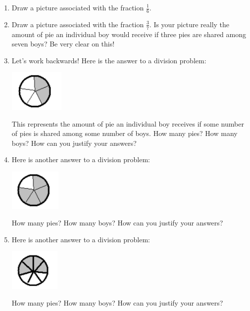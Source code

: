 \documentclass[10pt, reqno]{amsart}
\theoremstyle{remark}
\theoremstyle{definition}
\numberwithin{equation}{section}  %
\begin{document}
 \begin{enumerate}
 \item
 Draw a picture associated with the fraction $ \frac 1 6$.\\
 
 \item
Draw a picture associated with the fraction $ \frac 3 7$.
Is your picture
really the amount of pie an individual boy would receive if three pies are shared
among seven boys? Be very clear on this!\\

\item
Let's work backwards! Here is the answer to a division problem:
\begin{center}
\includegraphics[height = 2cm]{2fifthspie}
\end{center}
This represents the amount of pie an individual boy receives if some number of pies
is shared among some number of boys.  How many pies?  How many boys?  How can you justify your answers?\\

\item
Here is another answer to a division problem:
\begin{center}
\includegraphics[height = 2cm]{4fifthspie}
\end{center}
How many pies?  How many boys?  How can you justify your answers?\\


\item
Here is another answer to a division problem:
\begin{center}
\includegraphics[height = 2cm]{4seventhspie}
\end{center}
How many pies?  How many boys?  How can you justify your answers?\\


\end{enumerate}
\end{document}
